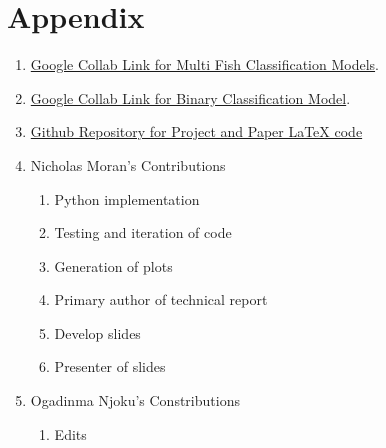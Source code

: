 \section{Appendix}

\begin{enumerate}
  \item \href{https://colab.research.google.com/drive/1fzchCm2pAXP1QkVQxi5Q7eg_Qs5l6oL_?usp=sharing}{Google Collab Link for Multi Fish Classification Models}. 
  \item \href{https://colab.research.google.com/drive/1mVBJBl-0e7mP-uyzWXc_6bWkA9c4KKQ5?usp=sharing}{Google Collab Link for Binary Classification Model}. 
  \item \href{https://github.com/nichipedia/fish_detector}{Github Repository for Project and Paper LaTeX code}
  \item Nicholas Moran's Contributions
      \begin{enumerate}
        \item Python implementation
        \item Testing and iteration of code
        \item Generation of plots 
        \item Primary author of technical report
        \item Develop slides
        \item Presenter of slides
      \end{enumerate}
  \item Ogadinma Njoku's Constributions
      \begin{enumerate}
        \item Edits 
      \end{enumerate}
\end{enumerate}
